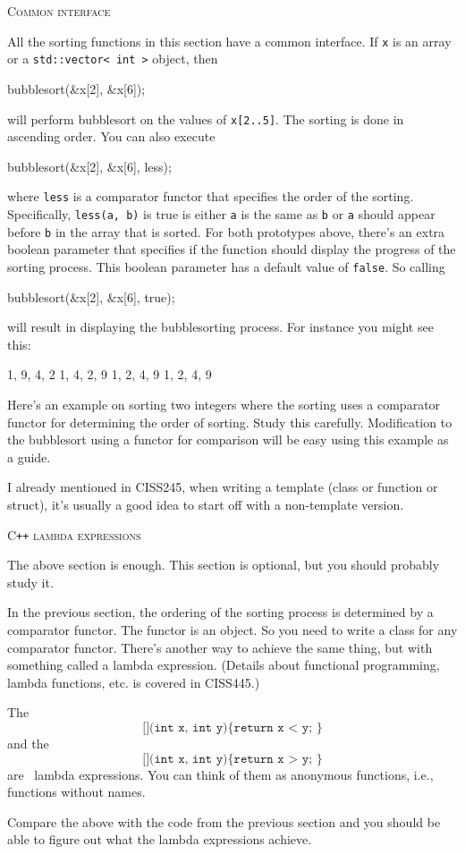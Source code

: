 \textsc{Common interface}

All the sorting functions in this section have a common interface.
If \verb!x! is an array or
a \verb!std::vector< int >! object, then
\begin{console}[fontsize=\footnotesize]
bubblesort(&x[2], &x[6]);
\end{console}
will perform bubblesort on the values of \verb!x[2..5]!.
The sorting is done in ascending order.
You can also execute
\begin{console}[fontsize=\footnotesize]
bubblesort(&x[2], &x[6], less);
\end{console}
where \verb!less! is a comparator functor that specifies the order of the
sorting.
Specifically, \verb!less(a, b)! is true is either \verb!a! is the same as
\verb!b! or \verb!a! should appear before \verb!b! in the array
that is sorted.
For both prototypes above, there's an extra boolean parameter that specifies
if the function should display the progress of the sorting process.
This boolean parameter has a default value of \verb!false!.
So calling
\begin{console}[fontsize=\footnotesize]
bubblesort(&x[2], &x[6], true);
\end{console}
will result in displaying the bubblesorting process.
For instance you might see this:
\begin{console}[fontsize=\footnotesize]
{1, 9, 4, 2}
{1, 4, 2, 9}
{1, 2, 4, 9}
{1, 2, 4, 9}
\end{console}

Here's an example on sorting two integers where the sorting uses
a comparator functor for determining the order of sorting.
Study this carefully.
Modification to the bubblesort using a functor for comparison will be easy
using this example as a guide.

I already mentioned in CISS245, when writing a template
(class or function or struct),
it's usually a good idea to start off with a non-template version.



\newpage
\textsc{C\texttt{++} lambda expressions}

The above section is enough.
This section is optional, but you should probably study it.

In the previous section, the ordering of the sorting process
is determined by a comparator functor.
The functor is an object.
So you need to write a class for any comparator functor.
There's another way to achieve the same thing, but with
something called a lambda expression.
(Details about functional programming, lambda functions, etc. is covered
in CISS445.)


The
\[
\texttt{[](int x, int y)\{ return x < y; \}}
\]
and the
\[
\texttt{[](int x, int y)\{ return x > y; \}}
\]
are \cpp\ lambda expressions.
You can think of them as anonymous functions, i.e.,
functions without names.

Compare the above with the code from the previous section
and you should be able to figure out what the lambda expressions
achieve.
